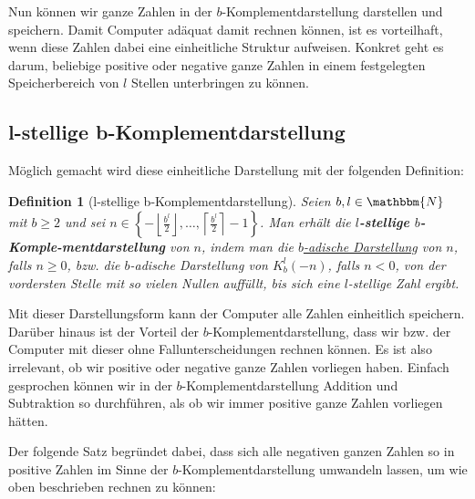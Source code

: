 \documentclass{article}
\newcommand{\N}{\mathbbm{N}} %
\newtheorem{definition}[satz]{Definition}
\begin{document}
  \vspace{\baselineskip}

  Nun können wir ganze Zahlen in der $b$-Komplementdarstellung darstellen und speichern.
  Damit Computer adäquat damit rechnen können, ist es vorteilhaft, wenn diese Zahlen dabei eine einheitliche Struktur aufweisen.
  Konkret geht es darum, beliebige positive oder negative ganze Zahlen in einem festgelegten Speicherbereich von $l$ Stellen unterbringen zu können.

\subsection{l-stellige b-Komplementdarstellung}
  Möglich gemacht wird diese einheitliche Darstellung mit der folgenden Definition:

  \begin{definition}[l-stellige b-Komplementdarstellung] \label{def:l-stellige_b-Komplementdarstellung}
    Seien $b,l \in \N$ mit $b \geq 2$ und sei $n \in \left\{- \left\lfloor \displaystyle\frac{b^l}{2} \right\rfloor, \dots, \left\lceil \displaystyle\frac{b^l}{2} \right\rceil -1 \right\}$. 
    Man erhält die \textbf{$l$-stellige $b$-Komple-mentdarstellung} von $n$, indem man die \hyperref[satz:b-adische_Darstellung]{$b$-adische Darstellung} von $n$, falls $n \geq 0$,
    bzw. die $b$-adische Darstellung von $K_b^l(-n)$, falls $n < 0$, von der vordersten Stelle mit so vielen Nullen auffüllt, bis sich eine $l$-stellige Zahl ergibt.
  \end{definition}

  \vspace{\baselineskip}

  Mit dieser Darstellungsform kann der Computer alle Zahlen einheitlich speichern.
  Darüber hinaus ist der Vorteil der $b$-Komplementdarstellung, dass wir bzw. der Computer mit dieser ohne Fallunterscheidungen rechnen können.
  Es ist also irrelevant, ob wir positive oder negative ganze Zahlen vorliegen haben.
  Einfach gesprochen können wir in der $b$-Komplementdarstellung Addition und Subtraktion so durchführen, als ob wir immer positive ganze Zahlen vorliegen hätten.

  Der folgende Satz begründet dabei, dass sich alle negativen ganzen Zahlen so in positive Zahlen im Sinne der $b$-Komplementdarstellung umwandeln lassen, um wie oben beschrieben rechnen zu können:
\end{document}
